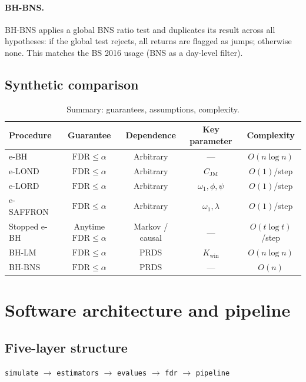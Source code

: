 \documentclass[11pt,a4paper,twocolumn]{article}
\theoremstyle{plain}
\theoremstyle{definition}
\theoremstyle{remark}
\newcommand{\FDR}{\mathrm{FDR}}
\begin{document}
\paragraph{BH-BNS.}
BH-BNS applies a global BNS ratio test and duplicates its result across all
hypotheses: if the global test rejects, all returns are flagged as jumps;
otherwise none. This matches the BS 2016 usage (BNS as a day-level filter).

\subsection{Synthetic comparison}

\begin{table}[t]
\centering
\caption{Summary: guarantees, assumptions, complexity.}
\label{tab:procs_detail}
\begin{tabular}{lcccc}
\toprule
Procedure & Guarantee & Dependence & Key parameter & Complexity \\
\midrule
e-BH & $\FDR \le \alpha$ & Arbitrary & --- & $O(n\log n)$ \\
e-LOND & $\FDR \le \alpha$ & Arbitrary & $C_\mathrm{JM}$ & $O(1)$/step \\
e-LORD & $\FDR \le \alpha$ & Arbitrary & $\omega_1, \phi, \psi$ & $O(1)$/step \\
e-SAFFRON & $\FDR \le \alpha$ & Arbitrary & $\omega_1, \lambda$ & $O(1)$/step \\
Stopped e-BH & Anytime $\FDR \le \alpha$ & Markov / causal & --- & $O(t\log t)$/step \\
BH-LM & $\FDR \le \alpha$ & PRDS & $K_\mathrm{win}$ & $O(n\log n)$ \\
BH-BNS & $\FDR \le \alpha$ & PRDS & --- & $O(n)$ \\
\bottomrule
\end{tabular}
\end{table}


\section{Software architecture and pipeline}
\label{sec:pipeline}

\subsection{Five-layer structure}

\begin{center}
\texttt{simulate} $\to$ \texttt{estimators} $\to$ \texttt{evalues} $\to$
\texttt{fdr} $\to$ \texttt{pipeline}
\end{center}
\end{document}

